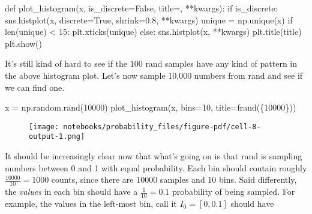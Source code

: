 \documentclass[
  letterpaper,
  DIV=11,
  numbers=noendperiod]{scrreprt}
\newenvironment{Shaded}{\begin{snugshade}}{\end{snugshade}}
\newcommand{\BuiltInTok}[1]{\textcolor[rgb]{0.00,0.23,0.31}{#1}}
\newcommand{\ControlFlowTok}[1]{\textcolor[rgb]{0.00,0.23,0.31}{#1}}
\newcommand{\DecValTok}[1]{\textcolor[rgb]{0.68,0.00,0.00}{#1}}
\newcommand{\FloatTok}[1]{\textcolor[rgb]{0.68,0.00,0.00}{#1}}
\newcommand{\KeywordTok}[1]{\textcolor[rgb]{0.00,0.23,0.31}{#1}}
\newcommand{\NormalTok}[1]{\textcolor[rgb]{0.00,0.23,0.31}{#1}}
\newcommand{\OperatorTok}[1]{\textcolor[rgb]{0.37,0.37,0.37}{#1}}
\newcommand{\SpecialCharTok}[1]{\textcolor[rgb]{0.37,0.37,0.37}{#1}}
\newcommand{\SpecialStringTok}[1]{\textcolor[rgb]{0.13,0.47,0.30}{#1}}
\newcommand{\StringTok}[1]{\textcolor[rgb]{0.13,0.47,0.30}{#1}}
\newcommand{\VariableTok}[1]{\textcolor[rgb]{0.07,0.07,0.07}{#1}}
\begin{document}
\begin{Shaded}
\begin{Highlighting}[]
\KeywordTok{def}\NormalTok{ plot\_histogram(x, is\_discrete}\OperatorTok{=}\VariableTok{False}\NormalTok{, title}\OperatorTok{=}\StringTok{\textquotesingle{}\textquotesingle{}}\NormalTok{, }\OperatorTok{**}\NormalTok{kwargs):}
    \ControlFlowTok{if}\NormalTok{ is\_discrete:}
\NormalTok{        sns.histplot(x, discrete}\OperatorTok{=}\VariableTok{True}\NormalTok{, shrink}\OperatorTok{=}\FloatTok{0.8}\NormalTok{, }\OperatorTok{**}\NormalTok{kwargs)}
\NormalTok{        unique }\OperatorTok{=}\NormalTok{ np.unique(x)}
        \ControlFlowTok{if} \BuiltInTok{len}\NormalTok{(unique) }\OperatorTok{\textless{}} \DecValTok{15}\NormalTok{:}
\NormalTok{            plt.xticks(unique)}
    \ControlFlowTok{else}\NormalTok{:}
\NormalTok{        sns.histplot(x, }\OperatorTok{**}\NormalTok{kwargs)}
\NormalTok{    plt.title(title)}
\NormalTok{    plt.show()}
\end{Highlighting}
\end{Shaded}

It's still kind of hard to see if the \(100\) rand samples have any kind
of pattern in the above histogram plot. Let's now sample 10,000 numbers
from rand and see if we can find one.

\begin{Shaded}
\begin{Highlighting}[]
\NormalTok{x }\OperatorTok{=}\NormalTok{ np.random.rand(}\DecValTok{10000}\NormalTok{)}
\NormalTok{plot\_histogram(x, bins}\OperatorTok{=}\DecValTok{10}\NormalTok{, title}\OperatorTok{=}\SpecialStringTok{f\textquotesingle{}rand(}\SpecialCharTok{\{}\DecValTok{10000}\SpecialCharTok{\}}\SpecialStringTok{)\textquotesingle{}}\NormalTok{)}
\end{Highlighting}
\end{Shaded}

\begin{figure}[H]

{\centering \texttt{[image: notebooks/probability\_files/figure-pdf/cell-8-output-1.png]}

}

\end{figure}

It should be increasingly clear now that what's going on is that rand is
sampling numbers between 0 and 1 with equal probability. Each bin should
contain roughly \(\frac{10000}{10}=1000\) counts, since there are
\(10000\) samples and \(10\) bins. Said differently, the \emph{values}
in each bin should have a \(\frac{1}{10}=0.1\) probability of being
sampled. For example, the values in the left-most bin, call it
\(I_0 = [0, 0.1]\) should have
\end{document}
